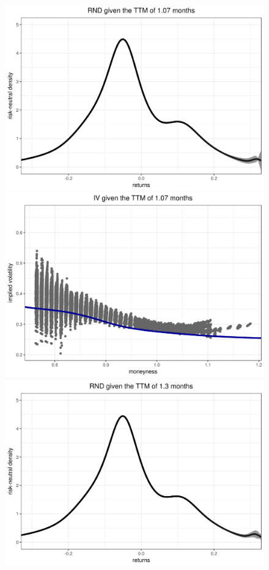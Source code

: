 \documentclass[a4paper,12pt]{article}
\theoremstyle{plain}
\theoremstyle{definition}
\begin{document}
\begin{figure}[H]
\begin{center}
 \includegraphics[width=\linewidth]{figures/hour_5th/GOOG_20150105_rnd_ci_5th_hour_ttm_1_07.png}
 \endminipage
 \hspace{3mm}
 \includegraphics[width=\linewidth]{figures/hour_5th/GOOG_20150105_iv_smile_5th_hour_ttm_1_07.png}
 \endminipage\\
 \includegraphics[width=\linewidth]{figures/hour_5th/GOOG_20150105_rnd_ci_5th_hour_ttm_1_3.png}

\end{center}
\end{figure}
\end{document}
